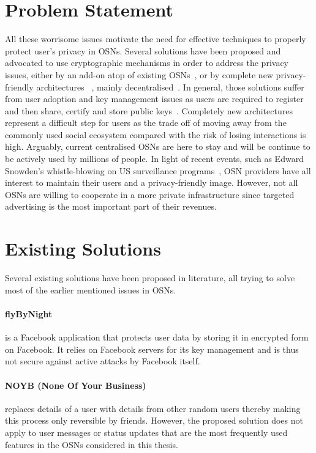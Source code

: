 \section{Problem Statement}
\label{sec:problem_statement}
All these worrisome issues motivate the need for effective techniques to properly protect user's privacy in OSNs. Several solutions have been proposed and advocated to use cryptographic mechanisms in order to address the privacy issues, either by an add-on atop of existing OSNs~\cite{art:BadenBSBS09,art:BeatoKW11,art:GuhaSTF08,art:LuoXH09}, or by complete new privacy-friendly architectures~ \cite{art:CristofaroSTW11}, mainly decentralised~\cite{art:CutilloMO11,NYT2010.Diaspora}. In general, those solutions suffer from user adoption and key management issues as users are required to register and then share, certify and store public keys~\cite{art:BalseBADG14}. Completely new architectures represent a difficult step for users as the trade off of moving away from the commonly used social ecosystem compared with the risk of losing interactions is high. Arguably, current centralised OSNs are here to stay and will be continue to be actively used by millions of people. In light of recent events, such as Edward Snowden's whistle-blowing on US surveillance programs~\cite{prism}, OSN providers have all interest to maintain their users and a privacy-friendly image. However, not all OSNs are willing to cooperate in a more private infrastructure since targeted advertising is the most important part of their revenues.

\section{Existing Solutions}
\label{sec:existing_solutions}
Several existing solutions have been proposed in literature, all trying to solve most of the earlier mentioned issues in OSNs.

\paragraph{flyByNight~\cite{art:LucasB09}} is a Facebook application that protects user data by storing it in encrypted form on Facebook. It relies on Facebook servers for its key management and is thus not secure against active attacks by Facebook itself.

\paragraph{NOYB (None Of Your Business)~\cite{art:GuhaSTF08}} replaces details of a user with details from other random users thereby making this process only reversible by friends. However, the proposed solution does not apply to user messages or status updates that are the most frequently used features in the OSNs considered in this thesis.

